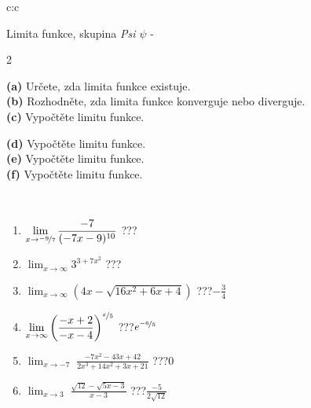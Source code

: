 \documentclass[10pt]{report}
\begin{document}
\begin{tabular}{c:c}
\begin{minipage}[c][104.5mm][t]{0.5\linewidth}
\begin{center}
\vspace{7mm}
{\huge Limita funkce, skupina \textit{Psi $\psi$} -}\\[5mm]
\begin{minipage}{0.95\linewidth}
\begin{center}
{\small \begin{multicols}{2} \raggedright
\textbf{(a)} Určete, zda limita funkce existuje. \\[1mm]
\textbf{(b)} Rozhodněte, zda limita funkce konverguje nebo diverguje. \\[1mm]
\textbf{(c)} Vypočtěte limitu funkce. \par \columnbreak
\textbf{(d)} Vypočtěte limitu funkce. \\[1mm]
\textbf{(e)} Vypočtěte limitu funkce. \\[1mm]
\textbf{(f)} Vypočtěte limitu funkce. \\[1mm]
\end{multicols}
}
\end{center}
\end{minipage}
\\[4mm]
\begin{minipage}{0.79\linewidth}
\begin{center}
\begin{varwidth}{\linewidth}
\begin{enumerate}
\normalsize
\item $\displaystyle\lim_{x\to\nicefrac{-9}{7}}{\frac{-7}{(-7x-9)^{10}}}$\quad \dotfill\; ???\;\dotfill \quad {}
\item $\displaystyle\lim_{x\to\infty}{3^{3+7x^2}}$\quad \dotfill\; ???\;\dotfill \quad {}
\item $\displaystyle\lim_{x\to\infty}{\left(4x - \sqrt{16x^2+6x+4}\right)}$\quad \dotfill\; ???\;\dotfill \quad $-\frac{3}{4}$
\item $\displaystyle\lim_{x\to\infty}{\left( \frac{-x+2}{-x-4} \right)^{\nicefrac{x}{5}}}$\quad \dotfill\; ???\;\dotfill \quad $e^{\nicefrac{-6}{5}}$
\item $\displaystyle\lim_{x\to -7}{\;\frac{-7x^2-43x+42}{2x^3+14x^2+3x+21}}$\quad \dotfill\; ???\;\dotfill \quad $0$
\item $\displaystyle\lim_{x\to 3}{\;\frac{\sqrt{12}-\sqrt{5x-3}}{x-3}}$\quad \dotfill\; ???\;\dotfill \quad $\frac{-5}{2\sqrt{12}}$

\end{enumerate}
\end{varwidth}
\end{center}
\end{minipage}
\end{center}
\end{minipage}
\end{tabular}
\end{document}
